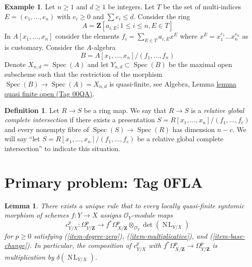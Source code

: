 \documentclass{amsart}
\theoremstyle{plain}
\newtheorem{lemma}[subsection]{Lemma}
\theoremstyle{definition}
\newtheorem{definition}[subsection]{Definition}
\newtheorem{example}[subsection]{Example}
\theoremstyle{remark}
\numberwithin{equation}{subsection}
\def\Spec{\mathop{\mathrm{Spec}}}
\def\NL{\mathop{N\!L}\nolimits}
\begin{document}
\begin{example}
\label{discriminant-example-universal-quasi-finite-syntomic}
Let $n \geq 1$ and $d \geq 1$ be integers. Let $T$ be the set of
multi-indices $E = (e_1, \ldots, e_n)$ with $e_i \geq 0$ and
$\sum e_i \leq d$. Consider the ring
$$
A = \mathbf{Z}[a_{i, E} ; 1 \leq i \leq n, E \in T]
$$
In $A[x_1, \ldots, x_n]$ consider the elements
$f_i = \sum_{E \in T} a_{i, E} x^E$ where $x^E = x_1^{e_1} \ldots x_n^{e_n}$
as is customary. Consider the $A$-algebra
$$
B = A[x_1, \ldots, x_n]/(f_1, \ldots, f_n)
$$
Denote $X_{n, d} = \Spec(A)$ and let $Y_{n, d} \subset \Spec(B)$
be the maximal open subscheme such that the restriction of the
morphism $\Spec(B) \to \Spec(A) = X_{n, d}$ is quasi-finite, see
Algebra, Lemma \href{https://stacks.math.columbia.edu/tag/00QA}{lemma quasi finite open (Tag 00QA)}.
\end{example}

\begin{definition}
\label{algebra-definition-relative-global-complete-intersection}
Let $R \to S$ be a ring map. We say that $R \to S$ is
a {\it relative global complete intersection} if there exists
a presentation $S = R[x_1, \ldots, x_n]/(f_1, \ldots, f_c)$ and
every nonempty fibre of $\Spec(S) \to \Spec(R)$ has dimension $n - c$.
We will say ``let $S = R[x_1, \ldots, x_n]/(f_1, \ldots, f_c)$ be a relative
global complete intersection'' to indicate this situation.
\end{definition}

\section*{Primary problem: Tag 0FLA}
\begin{lemma}
\label{lemma-Garel-upstairs}
There exists a unique rule that to every locally quasi-finite syntomic
morphism of schemes $f : Y \to X$ assigns $\mathcal{O}_Y$-module maps
$$
c^p_{Y/X} :
\Omega^p_{Y/\mathbf{Z}}
\longrightarrow
f^*\Omega^p_{X/\mathbf{Z}} \otimes_{\mathcal{O}_Y} \det(\NL_{Y/X})
$$
for $p \geq 0$ satisfying (\ref{item-degree-zero}), (\ref{item-multiplicative}),
and (\ref{item-base-change}). In particular, the composition of
$c^p_{Y/X}$ with $f^*\Omega^p_{X/\mathbf{Z}} \to \Omega^p_{Y/\mathbf{Z}}$
is multiplication by $\delta(\NL_{Y/X})$.
\end{lemma}
\end{document}
